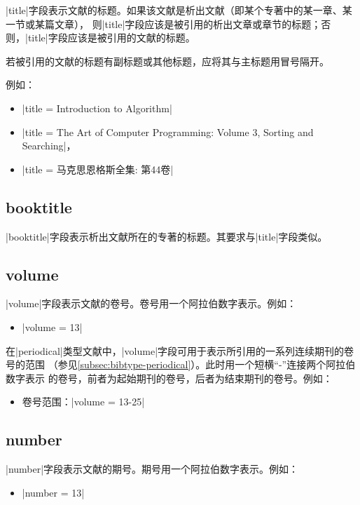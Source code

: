 |title|字段表示文献的标题。如果该文献是析出文献（即某个专著中的某一章、某一节或某篇文章），
则|title|字段应该是被引用的析出文章或章节的标题；否则，|title|字段应该是被引用的文献的标题。

若被引用的文献的标题有副标题或其他标题，应将其与主标题用冒号隔开。

例如：
\begin{itemize}
\item |title = {Introduction to Algorithm}|
\item |title = {The Art of Computer Programming: Volume 3, Sorting and Searching}|，
\item |title = {马克思恩格斯全集: 第44卷}|
\end{itemize}

\subsection{booktitle}\label{subsec:bibfield-booktitle}

|booktitle|字段表示析出文献所在的专著的标题。其要求与|title|字段类似。

\subsection{volume}\label{subsec:bibfield-volume}

|volume|字段表示文献的卷号。卷号用一个阿拉伯数字表示。例如：
\begin{itemize}
\item |volume = {13}|
\end{itemize}

在|periodical|类型文献中，|volume|字段可用于表示所引用的一系列连续期刊的卷号的范围
（参见\ref{subsec:bibtype-periodical}）。此时用一个短横``-''连接两个阿拉伯数字表示
的卷号，前者为起始期刊的卷号，后者为结束期刊的卷号。例如：
\begin{itemize}
\item 卷号范围：|volume = {13-25}|
\end{itemize}

\subsection{number}\label{subsec:bibfield-number}

|number|字段表示文献的期号。期号用一个阿拉伯数字表示。例如：
\begin{itemize}
\item |number = {13}|
\end{itemize}

